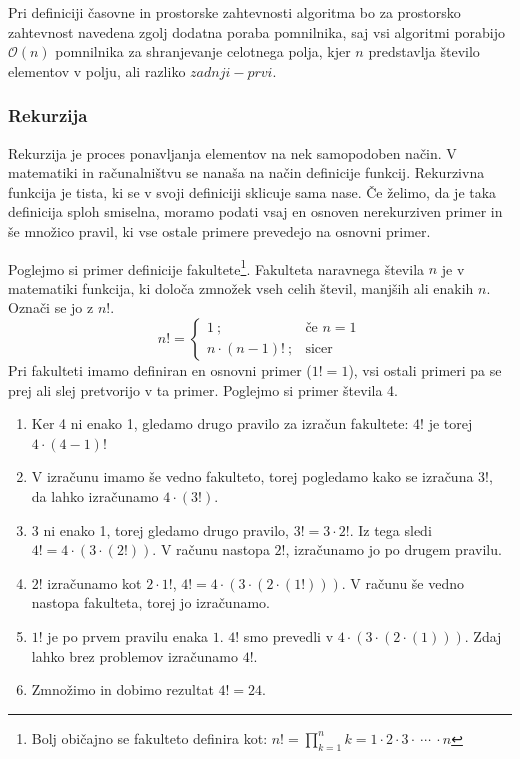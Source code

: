 \documentclass[a4paper,oneside,12pt]{article}
\begin{document}
Pri definiciji časovne in prostorske zahtevnosti algoritma bo za prostorsko zahtevnost 
navedena zgolj dodatna poraba pomnilnika, saj vsi algoritmi porabijo $\mathcal{O}(n)$ pomnilnika za
shranjevanje celotnega polja, kjer $n$ predstavlja število elementov v polju, ali razliko
$zadnji - prvi$. 
\subsubsection{Rekurzija}
\label{chapter:rekurzija}
Rekurzija je proces ponavljanja elementov na nek samopodoben način. V matematiki in 
računalništvu se nanaša na način definicije funkcij. Rekurzivna funkcija je tista, 
ki se v svoji definiciji sklicuje sama nase. Če želimo, da je taka definicija sploh 
smiselna, moramo podati vsaj en osnoven nerekurziven primer in še množico pravil, 
ki vse ostale primere prevedejo na osnovni primer.

Poglejmo si primer definicije fakultete\footnote{Bolj običajno se fakulteto definira kot:
$n! = \displaystyle\prod_{k=1}^{n} k = 1 \cdot 2 \cdot 3 \cdot \ \cdots\  \cdot n$}. Fakulteta naravnega števila $n$ je v matematiki
funkcija, ki določa zmnožek vseh celih števil, manjših ali enakih $n$. Označi se jo z $n!$.
\[
n! = \left\{ 
\begin{array}{rl}
     1             \ ;& \mbox{če $n = 1$} \\
     n \cdot (n-1)!\ ;& \mbox{sicer}
\end{array} \right.
\]
Pri fakulteti imamo definiran en osnovni primer ($1! = 1$), vsi ostali primeri pa se prej
ali slej pretvorijo v ta primer. Poglejmo si primer števila 4.
\begin{enumerate}
  \item Ker 4 ni enako 1, gledamo drugo pravilo za izračun fakultete: $4!$ je torej $4
    \cdot \left(4 - 1\right)!$
  \item V izračunu imamo še vedno fakulteto, torej pogledamo kako se izračuna $3!$, da
    lahko izračunamo $4 \cdot \left(3!\right)$.
  \item 3 ni enako 1, torej gledamo drugo pravilo, $3! = 3 \cdot 2!$. Iz tega sledi \mbox{$4! =
    4 \cdot \left(3 \cdot \left(2!\right)\right)$}. V računu nastopa $2!$, izračunamo jo po drugem pravilu.
  \item $2!$ izračunamo kot $2 \cdot 1!$, $4! = 4 \cdot \left(3 \cdot \left(2 \cdot \left(1!\right)\right)\right)$. V računu še
    vedno nastopa fakulteta, torej jo izračunamo.
  \item $1!$ je po prvem pravilu enaka $1$. $4!$ smo prevedli v $4 \cdot \left(3 \cdot \left(2 \cdot
    \left(1\right)\right)\right)$. Zdaj lahko brez problemov izračunamo $4!$.
  \item Zmnožimo in dobimo rezultat $4! = 24$.
\end{enumerate}
\end{document}
